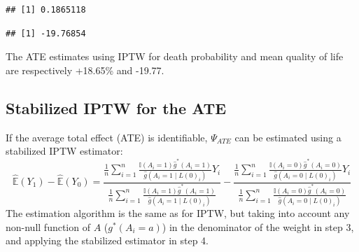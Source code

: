 \documentclass[
]{book}
\newenvironment{Shaded}{\begin{snugshade}}{\end{snugshade}}
\newcommand{\DecValTok}[1]{\textcolor[rgb]{0.00,0.00,0.81}{#1}}
\newcommand{\FunctionTok}[1]{\textcolor[rgb]{0.13,0.29,0.53}{\textbf{#1}}}
\newcommand{\NormalTok}[1]{#1}
\newcommand{\OtherTok}[1]{\textcolor[rgb]{0.56,0.35,0.01}{#1}}
\newcommand{\SpecialCharTok}[1]{\textcolor[rgb]{0.81,0.36,0.00}{\textbf{#1}}}
\begin{document}
\begin{verbatim}
## [1] 0.1865118
\end{verbatim}

\begin{Shaded}
\end{Shaded}

\begin{verbatim}
## [1] -19.76854
\end{verbatim}

The ATE estimates using IPTW for death probability and mean quality of life are respectively +18.65\% and -19.77.

\subsection{Stabilized IPTW for the ATE}\label{stabilized-iptw-for-the-ate}

If the average total effect (ATE) is identifiable, \(\Psi_{ATE}\) can be estimated using a stabilized IPTW estimator:
\begin{equation}
\hat{\mathbb{E}}(Y_1) - \hat{\mathbb{E}}(Y_0) =  \frac{\frac{1}{n} \sum_{i=1}^n \frac{\mathbb{I}(A_i=1)\hat{g}^*(A_i=1)}{\hat{g}(A_i=1 \mid L(0)_i)} Y_i}{ \frac{1}{n} \sum_{i=1}^n \frac{\mathbb{I}(A_i=1)\hat{g}^*(A_i=1)}{\hat{g}(A_i=1 \mid L(0)_i)}} - \frac{\frac{1}{n} \sum_{i=1}^n \frac{\mathbb{I}(A_i=0)\hat{g}^*(A_i=0)}{\hat{g}(A_i=0 \mid L(0)_i)} Y_i}{ \frac{1}{n} \sum_{i=1}^n \frac{\mathbb{I}(A_i=0)\hat{g}^*(A_i=0)}{\hat{g}(A_i=0 \mid L(0)_i)}}
\end{equation}
The estimation algorithm is the same as for IPTW, but taking into account any non-null function of \(A\) (\(g^*(A_i=a)\)) in the denominator of the weight in step 3, and applying the stabilized estimator in step 4.
\end{document}
